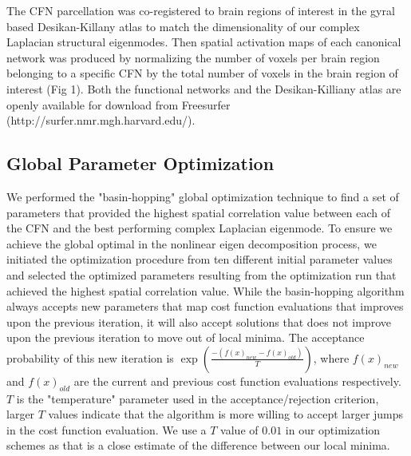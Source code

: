 \documentclass{article}
\begin{document}
The CFN parcellation was co-registered to brain regions of interest in the gyral based Desikan-Killany atlas \cite{Desikan2006} to match the dimensionality of our complex Laplacian structural eigenmodes. Then spatial activation maps of each canonical network was produced by normalizing the number of voxels per brain region belonging to a specific CFN by the total number of voxels in the brain region of interest (Fig 1). Both the functional networks and the Desikan-Killiany atlas are openly available for download from Freesurfer \cite{Fischl2012} (http://surfer.nmr.mgh.harvard.edu/).

\subsection{Global Parameter Optimization}
We performed the "basin-hopping" global optimization technique \cite{Wales1997} to find a set of parameters that provided the highest spatial correlation value between each of the CFN and the best performing complex Laplacian eigenmode. To ensure we achieve the global optimal in the nonlinear eigen decomposition process, we initiated the optimization procedure from ten different initial parameter values and selected the optimized parameters resulting from the optimization run that achieved the highest spatial correlation value. While the basin-hopping algorithm always accepts new parameters that map cost function evaluations that improves upon the previous iteration, it will also accept solutions that does not improve upon the previous iteration to move out of local minima. The acceptance probability of this new iteration is $\exp(\frac{-(f(x)_{new} - f(x)_{old})}{T})$, where $f(x)_{new}$ and $f(x)_{old}$ are the current and previous cost function evaluations respectively. $T$ is the "temperature" parameter used in the acceptance/rejection criterion, larger $T$ values indicate that the algorithm is more willing to accept larger jumps in the cost function evaluation. We use a $T$ value of $0.01$ in our optimization schemes as that is a close estimate of the difference between our local minima.
\end{document}
